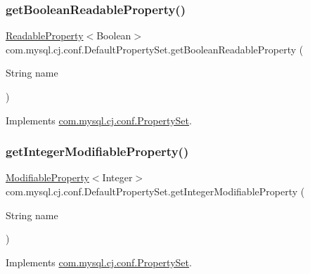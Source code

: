 \subsubsection{\texorpdfstring{get\+Boolean\+Readable\+Property()}{getBooleanReadableProperty()}}
{\footnotesize\ttfamily \mbox{\hyperlink{interfacecom_1_1mysql_1_1cj_1_1conf_1_1_readable_property}{Readable\+Property}}$<$Boolean$>$ com.\+mysql.\+cj.\+conf.\+Default\+Property\+Set.\+get\+Boolean\+Readable\+Property (\begin{DoxyParamCaption}\item[{String}]{name }\end{DoxyParamCaption})}



Implements \mbox{\hyperlink{interfacecom_1_1mysql_1_1cj_1_1conf_1_1_property_set_ac6b1377e1f71ba2facdf6d206264586e}{com.\+mysql.\+cj.\+conf.\+Property\+Set}}.

\mbox{\label{classcom_1_1mysql_1_1cj_1_1conf_1_1_default_property_set_a24f6c3107ffad2e900facd8f89f91029}} 
\subsubsection{\texorpdfstring{get\+Integer\+Modifiable\+Property()}{getIntegerModifiableProperty()}}
{\footnotesize\ttfamily \mbox{\hyperlink{interfacecom_1_1mysql_1_1cj_1_1conf_1_1_modifiable_property}{Modifiable\+Property}}$<$Integer$>$ com.\+mysql.\+cj.\+conf.\+Default\+Property\+Set.\+get\+Integer\+Modifiable\+Property (\begin{DoxyParamCaption}\item[{String}]{name }\end{DoxyParamCaption})}



Implements \mbox{\hyperlink{interfacecom_1_1mysql_1_1cj_1_1conf_1_1_property_set_a23c7b32f5aa0b61cd6b23ae0a712673b}{com.\+mysql.\+cj.\+conf.\+Property\+Set}}.

\mbox{\label{classcom_1_1mysql_1_1cj_1_1conf_1_1_default_property_set_a58ff54d9bc14d56562767d4cec5c510e}} 

